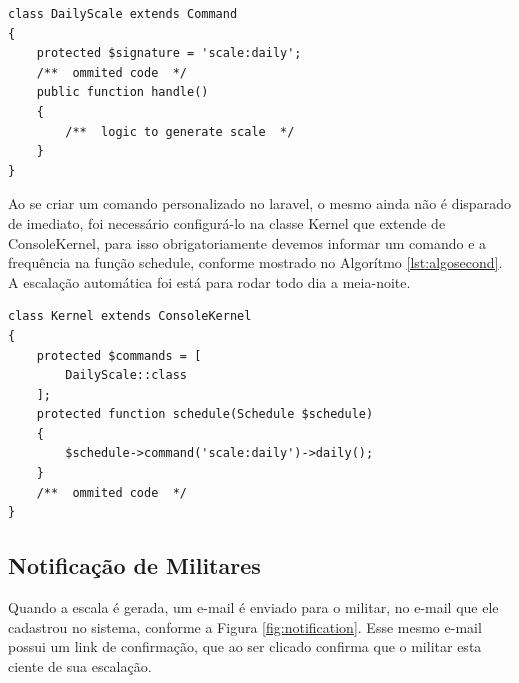 \begin{center}
\noindent\begin{minipage}[t]{0.80\linewidth}
\begin{lstlisting}[frame=single, caption={Classe responsável por gerar escala}, label={lst:algofirst}]
class DailyScale extends Command
{
    protected $signature = 'scale:daily';
    /**  ommited code  */
    public function handle()
    {
        /**  logic to generate scale  */
    }
}
\end{lstlisting}
\end{minipage}
\end{center}

Ao se criar um comando personalizado no laravel, o mesmo ainda não é disparado de imediato, foi necessário configurá-lo na classe Kernel que extende de ConsoleKernel, para isso obrigatoriamente devemos informar um comando e a frequência na função schedule, conforme mostrado no Algorítmo \ref{lst:algosecond}. A escalação automática foi está para rodar todo dia a meia-noite.

\begin{center}
\noindent\begin{minipage}[t]{0.80\linewidth}
\begin{lstlisting}[frame=single, caption={Configuração da geração da escala}, label={lst:algosecond}]
class Kernel extends ConsoleKernel
{
    protected $commands = [
        DailyScale::class
    ];
    protected function schedule(Schedule $schedule)
    {
        $schedule->command('scale:daily')->daily();
    }
    /**  ommited code  */
}
\end{lstlisting}
\end{minipage}
\end{center}

\subsection{Notificação de Militares}

Quando a escala é gerada, um e-mail é enviado para o militar, no e-mail que ele cadastrou no sistema, conforme a Figura \ref{fig:notification}. Esse mesmo e-mail possui um link de confirmação, que ao ser clicado confirma que o militar esta ciente de sua escalação.

